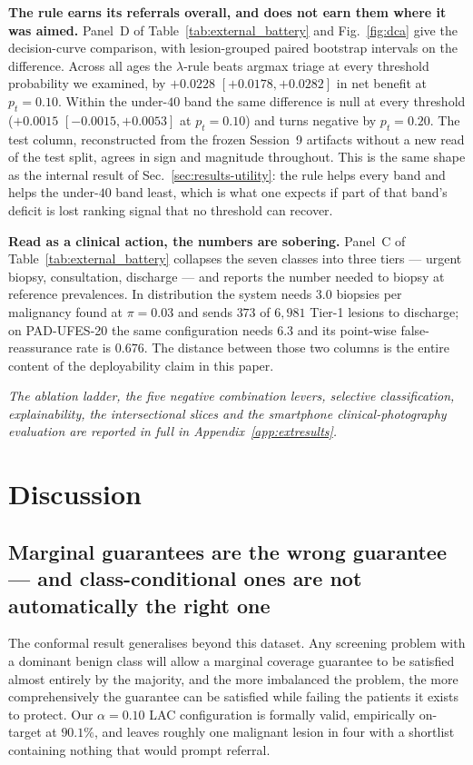 \documentclass[journal]{IEEEtran}
\begin{document}
\textbf{The rule earns its referrals overall, and does not earn them where it was aimed.}
Panel~D of Table~\ref{tab:external_battery} and Fig.~\ref{fig:dca} give the decision-curve
comparison, with lesion-grouped paired bootstrap intervals on the difference. Across all ages
the $\lambda$-rule beats argmax triage at every threshold probability we examined, by
$+0.0228$ $[+0.0178, +0.0282]$ in net benefit at $p_t = 0.10$. Within the under-$40$ band the
same difference is null at every threshold ($+0.0015$ $[-0.0015, +0.0053]$ at $p_t = 0.10$)
and turns negative by $p_t = 0.20$. The test column, reconstructed from the frozen Session~9
artifacts without a new read of the test split, agrees in sign and magnitude throughout. This
is the same shape as the internal result of Sec.~\ref{sec:results-utility}: the rule helps
every band and helps the under-$40$ band least, which is what one expects if part of that
band's deficit is lost ranking signal that no threshold can recover.

\textbf{Read as a clinical action, the numbers are sobering.} Panel~C of
Table~\ref{tab:external_battery} collapses the seven classes into three tiers --- urgent
biopsy, consultation, discharge --- and reports the number needed to biopsy at reference
prevalences. In distribution the system needs $3.0$ biopsies per malignancy found at
$\pi = 0.03$ and sends $373$ of $6{,}981$ Tier-1 lesions to discharge; on PAD-UFES-20 the same
configuration needs $6.3$ and its point-wise false-reassurance rate is $0.676$. The distance
between those two columns is the entire content of the deployability claim in this paper.


\textit{The ablation ladder, the five negative combination levers, selective classification, explainability, the intersectional slices and the smartphone clinical-photography evaluation are reported in full in Appendix~\ref{app:extresults}.}
\section{Discussion}

\subsection{Marginal guarantees are the wrong guarantee --- and class-conditional ones are
not automatically the right one}
The conformal result generalises beyond this dataset. Any screening problem with a dominant
benign class will allow a marginal coverage guarantee to be satisfied almost entirely by the
majority, and the more imbalanced the problem, the more comprehensively the guarantee can be
satisfied while failing the patients it exists to protect. Our $\alpha=0.10$ LAC configuration
is formally valid, empirically on-target at $90.1\%$, and leaves roughly one malignant lesion
in four with a shortlist containing nothing that would prompt referral.
\end{document}
